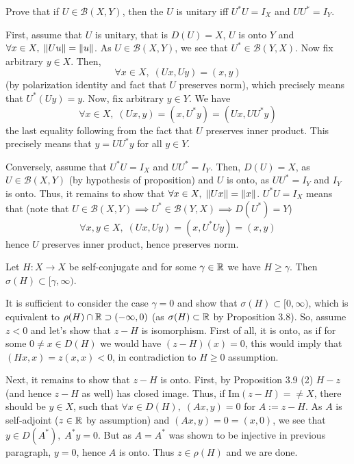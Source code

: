 \documentclass[10pt]{article} %
\begin{document}
\begin{myprob}[Proposition 3.4]
Prove that if $U\in\mathcal{B}(X,Y)$, then the $U$ is unitary iff $U^*U=I_X$ and $UU^*=I_Y$.
\end{myprob}
First, assume that $U$ is unitary, that is $D(U)=X$, $U$ is onto $Y$ and $\forall x\in X,\;\|Uu\|=\|u\|$.
As $U\in\mathcal{B}(X,Y)$, we see that $U^*\in\mathcal{B}(Y,X)$. Now fix arbitrary $y\in X$. Then,
\[\forall x\in X,\;(Ux,Uy)=(x,y)\]
(by polarization identity and fact that $U$ preserves norm), which precisely means that $U^*(Uy)=y$. Now, fix arbitrary $y\in Y$.
We have
\[\forall x\in X,\;(Ux,y)=(x,U^*y)=(Ux,UU^*y)\]
the last equality following from the fact that $U$ preserves inner product. This precisely means that $y=UU^*y$ for all $y\in Y$.

Conversely, assume that $U^*U=I_X$ and $UU^*=I_Y$. Then, $D(U)=X$, as $U\in\mathcal{B}(X,Y)$ (by hypothesis of proposition)
and $U$ is onto, as $UU^*=I_Y$ and $I_Y$ is onto. Thus, it remains to show that $\forall x\in X,\;\|Ux\|=\|x\|$.
$U^*U=I_X$ means that (note that $U\in\mathcal{B}(X,Y)\implies U^*\in\mathcal{B}(Y,X)\implies D(U^*)=Y$)
\[\forall x,y\in X,\;(Ux,Uy)=(x,U^*Uy)=(x,y)\]
hence $U$ preserves inner product, hence preserves norm.
\begin{myprob}[Theorem 3.10]
Let $H:X\to X$ be self-conjugate and for some $\gamma\in\mathbb{R}$ we have $H\geq\gamma$. Then $\sigma(H)\subset[\gamma,\infty)$.
\end{myprob}
It is sufficient to consider the case $\gamma=0$ and show that $\sigma(H)\subset[0,\infty)$, which is equivalent to
$\rho(H)\cap\mathbb{R}\supset(-\infty,0)$ (as $\sigma(H)\subset\mathbb{R}$ by Proposition 3.8). So, assume $z<0$ and let's show
that $z-H$ is isomorphism. First of all, it is onto, as if for some $0\neq x\in D(H)$ we would have
 $(z-H)(x)=0$, this would imply that $(Hx,x)=z(x,x)<0$, in contradiction to $H\geq0$ assumption.

Next, it remains to show that $z-H$ is onto. First, by Proposition 3.9 (2) $H-z$ (and hence $z-H$ as well) has closed image.
Thus, if $\mbox{Im}(z-H)=\neq X$, there should be $y\in X$, such that $\forall x\in D(H),\;(Ax,y)=0$ for $A:=z-H$. As
$A$ is self-adjoint ($z\in\mathbb{R}$ by assumption) and $(Ax,y)=0=(x,0)$, we see that $y\in D(A^*),\;A^*y=0$. But as $A=A^*$ was
shown to be injective in previous paragraph, $y=0$, hence $A$ is onto. Thus $z\in\rho(H)$ and we are done.
\end{document}
